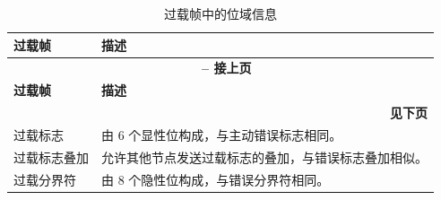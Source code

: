 \begin{longtable}[c]{|p{2.5cm}|p{13cm}|} 
    
  \caption{过载帧中的位域信息}
  \label{tab:twai-overload-frame-cn} 
  \\\hline
  \rowcolor{lightgray}
  \textbf{过载帧} & \textbf{描述}
  \\\hline
  \endfirsthead
  
  \multicolumn{2}{c}{\bfseries \tablename\ \thetable{} -- 接上页}\\  \hline
  
  \rowcolor{lightgray}
    \textbf{过载帧} & \textbf{描述}
  \\\hline
  \endhead
  
  \multicolumn{2}{r}{\textbf{见下页}} \\
  \endfoot
  \endlastfoot
  
    过载标志 & 由 6 个显性位构成，与主动错误标志相同。
          \\\hline
    过载标志叠加 & 允许其他节点发送过载标志的叠加，与错误标志叠加相似。
           \\\hline
    过载分界符 & 由 8 个隐性位构成，与错误分界符相同。              \\\hline
\end{longtable}
